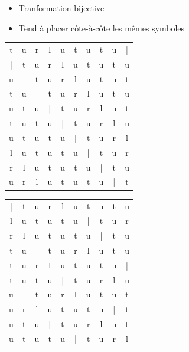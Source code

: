 \documentclass{beamer}
\newcommand{\tech}[1]{{\small \sc{#1}}}
\newcommand{\relief}[1]{{\color{structureTextColor} #1}}
\newcommand{\blue}[1]{{\color{regularblue} #1}}
\newcommand{\green}[1]{{\color{regulargreen} #1}}
\theoremstyle{theoreme}
\begin{document}
\begin{frame}
  \frametitle{\secname{}}
  \framesubtitle{\subsecname{}}

  \relief{\tech{bwt}}
  \begin{itemize}
    \item\pause Tranformation bijective
    \item\pause Tend à placer côte-à-côte les mêmes symboles
  \end{itemize}

  \pause

\begin{center}

{\ttfamily
\setlength{\tabcolsep}{1.5pt}\renewcommand{\arraystretch}{0.6}
  \begin{tabular}{cccccccccc}
t & u & r & l & u & t & u & t & u & \green{|}\\
\green{|} & t & u & r & l & u & t & u & t & u\\
u & \green{|} & t & u & r & l & u & t & u & t\\
t & u & \green{|} & t & u & r & l & u & t & u\\
u & t & u & \green{|} & t & u & r & l & u & t\\
t & u & t & u & \green{|} & t & u & r & l & u\\
u & t & u & t & u & \green{|} & t & u & r & l\\
l & u & t & u & t & u & \green{|} & t & u & r\\
r & l & u & t & u & t & u & \green{|} & t & u\\
u & r & l & u & t & u & t & u & \green{|} & t\\
  \end{tabular}
  \begin{tabular}{cccccccccc}
\green{|} & t & u & r & l & u & t & u & t & \blue{u}\\
l & u & t & u & t & u & \green{|} & t & u & \blue{r}\\
r & l & u & t & u & t & u & \green{|} & t & \blue{u}\\
t & u & \green{|} & t & u & r & l & u & t & \blue{u}\\
t & u & r & l & u & t & u & t & u & \green{|}\\
t & u & t & u & \green{|} & t & u & r & l & \blue{u}\\
u & \green{|} & t & u & r & l & u & t & u & \blue{t}\\
u & r & l & u & t & u & t & u & \green{|} & \blue{t}\\
u & t & u & \green{|} & t & u & r & l & u & \blue{t}\\
u & t & u & t & u & \green{|} & t & u & r & \blue{l}\\


\end{tabular}}
\end{center}
\end{frame}
\end{document}
